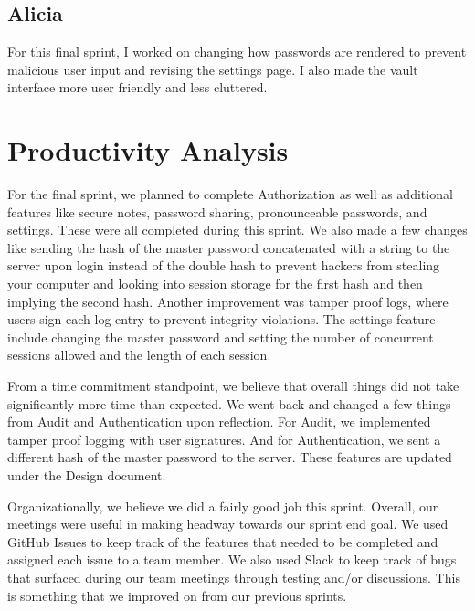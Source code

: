 \documentclass{article}
\begin{document}
\subsection{Alicia}
\par For this final sprint, I worked on changing how passwords are rendered to prevent malicious user input and revising the settings page. I also made the vault interface more user friendly and less cluttered.

\section{Productivity Analysis}
\par For the final sprint, we planned to complete Authorization as well as additional features like secure notes, password sharing, pronounceable passwords, and settings. These were all completed during this sprint. We also made a few changes like sending the hash of the master password concatenated with a string to the server upon login instead of the double hash to prevent hackers from stealing your computer and looking into session storage for the first hash and then implying the second hash. Another improvement was tamper proof logs, where users sign each log entry to prevent integrity violations. The settings feature include changing the master password and setting the number of concurrent sessions allowed and the length of each session.

\par From a time commitment standpoint, we believe that overall things did not take significantly more time than expected. We went back and changed a few things from Audit and Authentication upon reflection. For Audit, we implemented tamper proof logging with user signatures. And for Authentication, we sent a different hash of the master password to the server. These features are updated under the Design document.

\par Organizationally, we believe we did a fairly good job this sprint. Overall, our meetings were useful in making headway towards our sprint end goal. We used GitHub Issues to keep track of the features that needed to be completed and assigned each issue to a team member. We also used Slack to keep track of bugs that surfaced during our team meetings through testing and/or discussions. This is something that we improved on from our previous sprints.
\end{document}
